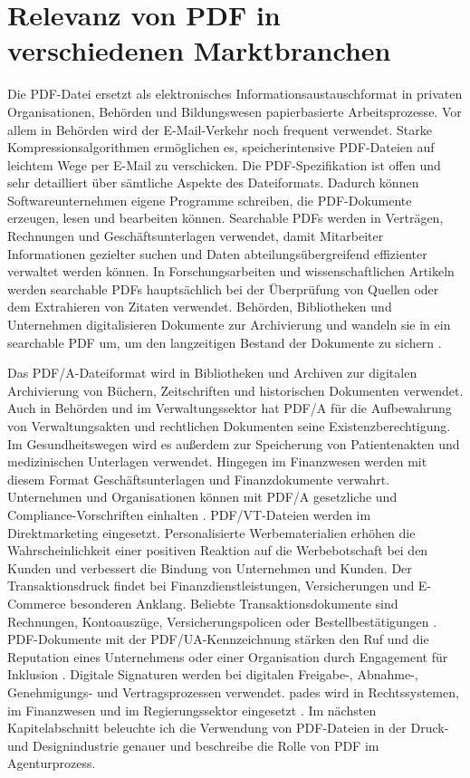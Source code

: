 \section{Relevanz von PDF in verschiedenen Marktbranchen}
Die PDF-Datei ersetzt als elektronisches Informationsaustauschformat in privaten Organisationen, Behörden und Bildungswesen papierbasierte Arbeitsprozesse. Vor allem in Behörden wird der E-Mail-Verkehr noch frequent verwendet. Starke Kompressionsalgorithmen ermöglichen es, speicherintensive PDF-Dateien auf leichtem Wege per E-Mail zu verschicken. Die PDF-Spezifikation ist offen und sehr detailliert über sämtliche Aspekte des Dateiformats. Dadurch können Softwareunternehmen eigene Programme schreiben, die PDF-Dokumente erzeugen, lesen und bearbeiten können. Searchable PDFs werden in Verträgen, Rechnungen und Geschäftsunterlagen verwendet, damit Mitarbeiter Informationen gezielter suchen und Daten abteilungsübergreifend effizienter verwaltet werden können. In Forschungsarbeiten und wissenschaftlichen Artikeln werden searchable PDFs hauptsächlich bei der Überprüfung von Quellen oder dem Extrahieren von Zitaten verwendet. Behörden, Bibliotheken und Unternehmen digitalisieren Dokumente zur Archivierung und wandeln sie in ein searchable PDF um, um den langzeitigen Bestand der Dokumente zu sichern \cite{adobe-search}.
\par
Das PDF/A-Dateiformat wird in Bibliotheken und Archiven zur digitalen Archivierung von Büchern, Zeitschriften und historischen Dokumenten verwendet. Auch in Behörden und im Verwaltungssektor hat PDF/A für die Aufbewahrung von Verwaltungsakten und rechtlichen Dokumenten seine Existenzberechtigung. Im Gesundheitswegen wird es außerdem zur Speicherung von Patientenakten und medizinischen Unterlagen verwendet. Hingegen im Finanzwesen werden mit diesem Format Geschäftsunterlagen und Finanzdokumente verwahrt. Unternehmen und Organisationen können mit PDF/A gesetzliche und Compliance-Vorschriften einhalten \cite{adobe-pdf-a}. PDF/VT-Dateien werden im Direktmarketing eingesetzt. Personalisierte Werbematerialien erhöhen die Wahrscheinlichkeit einer positiven Reaktion auf die Werbebotschaft bei den Kunden und verbessert die Bindung von Unternehmen und Kunden. Der Transaktionsdruck findet bei Finanzdienstleistungen, Versicherungen und E-Commerce besonderen Anklang. Beliebte Transaktionsdokumente sind Rechnungen, Kontoauszüge, Versicherungspolicen oder Bestellbestätigungen \cite{adobe-pdf-vt}. PDF-Dokumente mit der PDF/UA-Kennzeichnung stärken den Ruf und die Reputation eines Unternehmens oder einer Organisation durch Engagement für Inklusion \cite{adobe-pdf-ua}. Digitale Signaturen werden bei digitalen Freigabe-, Abnahme-, Genehmigungs- und Vertragsprozessen verwendet. \gls{pades} wird in Rechtssystemen, im Finanzwesen und im Regierungssektor eingesetzt \cite{adobe-pdf-pades}. Im nächsten Kapitelabschnitt beleuchte ich die Verwendung von PDF-Dateien in der Druck- und Designindustrie genauer und beschreibe die Rolle von PDF im Agenturprozess.  
